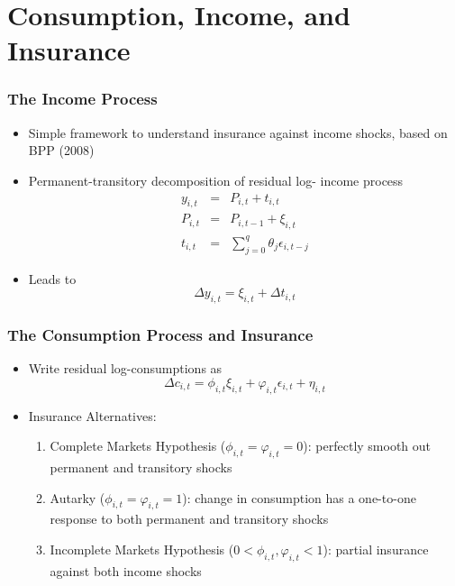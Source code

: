 \section{Consumption, Income, and Insurance}
\begin{frame}
	\frametitle{The Income Process}
	\begin{itemize}
		\item Simple framework to understand insurance against income shocks, based on BPP (2008)
		\item Permanent-transitory decomposition of residual log- income process
			\begin{eqnarray}
y_{i,t} &=&  P_{i,t} + t_{i,t} \nonumber \\
P_{i,t} &=& P_{i,t-1} + \xi_{i,t} \nonumber \\
t_{i,t} &=& \sum \limits _{j=0} ^q \theta_{j} \epsilon_{i,t-j} \nonumber
			\end{eqnarray}
			\item Leads to
			\begin{equation}
\Delta y_{i,t} = \xi_{i,t} + \Delta t_{i,t} \nonumber
			\end{equation}
	\end{itemize}
\end{frame}

\begin{frame}
	\frametitle{The Consumption Process and Insurance}
	\begin{itemize}
		\item Write residual log-consumptions as
		\begin{equation}
\Delta c_{i,t} = \phi_{i,t} \xi_{i,t} + \varphi_{i,t} \epsilon_{i,t} + \eta_{i,t} \nonumber \label{eq:conpro}
		\end{equation} 

		\item Insurance Alternatives:
			\begin{enumerate}
				\item Complete Markets Hypothesis ($\phi_{i,t} = \varphi_{i,t} = 0$): perfectly smooth out permanent and transitory shocks
				\item Autarky ($\phi_{i,t} = \varphi_{i,t} = 1$): change in consumption has a one-to-one response to both permanent and transitory shocks
				\item Incomplete Markets Hypothesis ($0 < \phi_{i,t} , \varphi_{i,t} < 1$): partial insurance against both income shocks
\end{enumerate}
	\end{itemize}
\end{frame}

